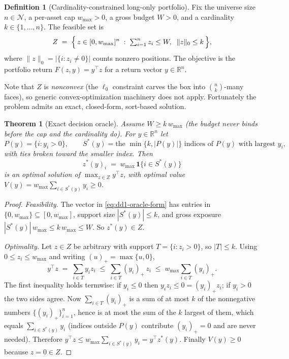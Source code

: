 \documentclass[11pt,a4paper]{article}
\theoremstyle{definition}
\newtheorem{definition}{Definition}[section]
\theoremstyle{plain}
\newtheorem{theorem}{Theorem}[section]
\newcommand{\R}{\mathbb{R}}
\newcommand{\N}{\mathcal{N}}
\begin{document}
\begin{definition}[Cardinality-constrained long-only portfolio]
\label{def:dd1-portfolio}
Fix the universe size $n \in \N$, a per-asset cap $w_{\max} > 0$, a gross
budget $W > 0$, and a cardinality $k \in \{1, \dots, n\}$. The feasible set is
\begin{equation}
\label{eq:dd1-Z}
Z \;=\; \Bigl\{\, z \in [0, w_{\max}]^n \;:\; \textstyle\sum_{i=1}^n z_i \le W,
\;\; \|z\|_0 \le k \,\Bigr\},
\end{equation}
where $\|z\|_0 = |\{i : z_i \neq 0\}|$ counts nonzero positions. The objective
is the portfolio return $F(z, y) = y^\top z$ for a return vector $y \in \R^n$.
\end{definition}

Note that $Z$ is \emph{nonconvex} (the $\ell_0$ constraint carves the box into
$\binom{n}{k}$-many faces), so generic convex-optimization machinery does not
apply. Fortunately the problem admits an exact, closed-form, sort-based
solution.

\begin{theorem}[Exact decision oracle]
\label{thm:dd1-oracle}
Assume $W \ge k\, w_{\max}$ (the budget never binds before the cap and the
cardinality do). For $y \in \R^n$ let
\[
P(y) = \{ i : y_i > 0 \}, \qquad
S^*(y) = \text{the } \min\{k, |P(y)|\} \text{ indices of } P(y) \text{ with
largest } y_i,
\]
with ties broken toward the smaller index. Then
\begin{equation}
\label{eq:dd1-oracle-form}
z^*(y)_i \;=\; w_{\max} \,\mathbf{1}\{ i \in S^*(y) \}
\end{equation}
is an optimal solution of $\max_{z \in Z} y^\top z$, with optimal value
$V(y) = w_{\max} \sum_{i \in S^*(y)} y_i \ge 0$.
\end{theorem}

\begin{proof}
\emph{Feasibility.} The vector in \eqref{eq:dd1-oracle-form} has entries in
$\{0, w_{\max}\} \subseteq [0, w_{\max}]$, support size $|S^*(y)| \le k$, and
gross exposure $|S^*(y)|\, w_{\max} \le k\, w_{\max} \le W$. So
$z^*(y) \in Z$.

\emph{Optimality.} Let $z \in Z$ be arbitrary with support
$T = \{i : z_i > 0\}$, so $|T| \le k$. Using $0 \le z_i \le w_{\max}$ and
writing $(u)_+ = \max\{u, 0\}$,
\[
y^\top z \;=\; \sum_{i \in T} y_i z_i
\;\le\; \sum_{i \in T} (y_i)_+ \, z_i
\;\le\; w_{\max} \sum_{i \in T} (y_i)_+ .
\]
The first inequality holds termwise: if $y_i \le 0$ then $y_i z_i \le 0 =
(y_i)_+ z_i$; if $y_i > 0$ the two sides agree. Now
$\sum_{i \in T} (y_i)_+$ is a sum of at most $k$ of the nonnegative numbers
$\{(y_i)_+\}_{i=1}^n$, hence is at most the sum of the $k$ largest of them,
which equals $\sum_{i \in S^*(y)} y_i$ (indices outside $P(y)$ contribute
$(y_i)_+ = 0$ and are never needed). Therefore
$y^\top z \le w_{\max} \sum_{i \in S^*(y)} y_i = y^\top z^*(y)$. Finally
$V(y) \ge 0$ because $z = 0 \in Z$.
\end{proof}
\end{document}

